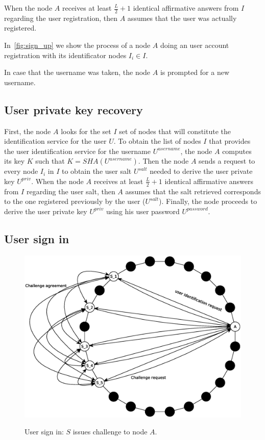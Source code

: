 When the node
$A$ receives at least $\frac{L}{2} + 1$ identical affirmative answers from
$I$ regarding the user registration, then $A$ assumes that the user was
actually registered.

In~\ref{fig:sign_up} we show the process of a node $A$ doing an user account
registration with its identificator nodes $I_i \in I$.

In case that the username was taken,
the node $A$ is prompted for a new username.



\subsection{User private key recovery}
\label{sec:private_key_recovery}

First, the node $A$ looks for the set $I$ set of nodes that will constitute the
identification service for the user $U$.
To obtain the list of nodes $I$ that provides the user identification service for
the username $U^{username}$, the node $A$ computes its key $K$ such that $K =
SHA(U^{username})$. 
Then the node $A$ sends a request to every node $I_i$ in $I$ to obtain the user
salt $U^{salt}$ needed to derive the user private key $U^{priv}$.
 When the node $A$ receives at least $\frac{L}{2} + 1$ identical affirmative answers from
$I$ regarding the user salt, then $A$ assumes that the salt retrieved
corresponds to the one registered previously by the user ($U^{salt}$). Finally,
the node proceeds to derive the user private key $U^{priv}$ using his user password $U^{password}$.

\subsection{User sign in}
\begin{figure}[!htb]
\centering
\includegraphics[width=14cm]{../img/sign_in}\\
\caption{User sign in: $S$ issues challenge to node $A$.}
\label{fig:sign_in}
\end{figure}

